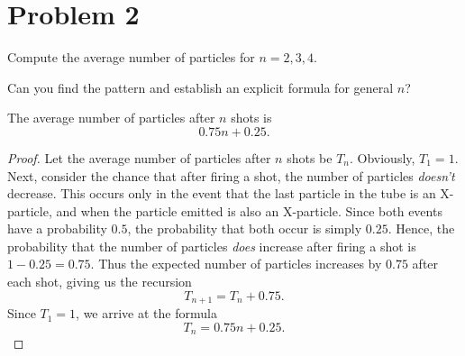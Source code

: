 \section{Problem 2}

Compute the average number of particles for $n = 2, 3, 4$.

Can you find the pattern and establish an explicit formula for general $n$?

\begin{theorem}\label{thm:2}
  The average number of particles after $n$ shots is \[
  0.75n + 0.25
  .\]
\end{theorem}
\begin{proof}
  Let the average number of particles after $n$ shots be $T_n$. Obviously, $T_1 = 1$. Next, consider the chance that after firing a shot, the number of particles \emph{doesn't} decrease. This occurs only in the event that the last particle in the tube is an X-particle, and when the particle emitted is also an X-particle. Since both events have a probability $0.5$, the probability that both occur is simply $0.25$. Hence, the probability that the number of particles \emph{does} increase after firing a shot is $1 - 0.25 = 0.75$. Thus the expected number of particles increases by $0.75$ after each shot, giving us the recursion \[
    T_{n+1} = T_{n} + 0.75
  .\] Since $T_1 = 1$, we arrive at the formula \[
    T_{n} = 0.75n + 0.25 \tag*{\qedhere}
  .\] 
\end{proof}
